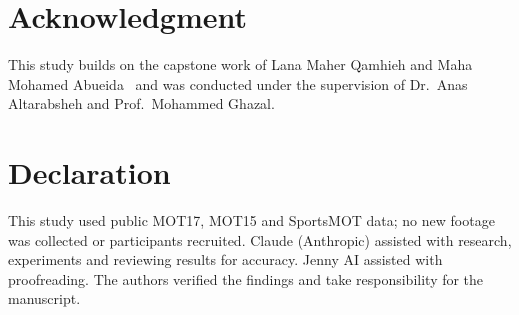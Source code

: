 \documentclass[conference]{IEEEtran}
\begin{document}
\section*{Acknowledgment}
This study builds on the capstone work of Lana Maher Qamhieh and Maha Mohamed Abueida~\cite{qamhieh2025capstone} and was conducted under the supervision of Dr.~Anas Altarabsheh and Prof.~Mohammed Ghazal.

\section*{Declaration}
This study used public MOT17, MOT15 and SportsMOT data; no new footage was collected or participants recruited. Claude (Anthropic) assisted with research, experiments and reviewing results for accuracy. Jenny AI assisted with proofreading. The authors verified the findings and take responsibility for the manuscript.



\end{document}
